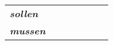 \documentclass[a4paper,12pt]{article}
\begin{document}
\begin{adjustwidth}{2em}{0pt}
\begin{tabular}{l|c|c|c|c|c|c}
\cellcolor{lightgray} \textbf{\textit{sollen}} &
\cellcolor{white}                  &
\cellcolor{white}                  &
\cellcolor{white}                  &
\cellcolor{white}                  &
\cellcolor{white}                  &
\cellcolor{white} \\

\cellcolor{lightgray} \textbf{\textit{mussen}} &
\cellcolor{white}                  &
\cellcolor{white}                  &
\cellcolor{white}                  &
\cellcolor{white}                  &
\cellcolor{white}                  &
\cellcolor{white} \\



\bottomrule
\end{tabular}
\vspace{0.3cm}
\newline



\end{adjustwidth}

\end{document}
